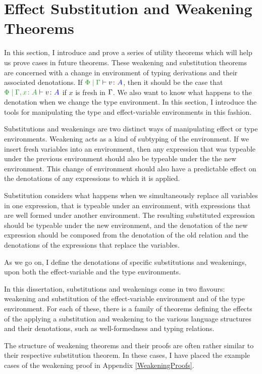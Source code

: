 \documentclass{Report}
\begin{document}
\section{Effect Substitution and Weakening Theorems}\label{SubsAndWeakening}


In this section, I introduce and prove a series of utility theorems which will help us prove cases in future theorems. These weakening and substitution theorems are concerned with a change in environment of typing derivations and their associated denotations. If $\gpetyperelation{v}{A}$, then it should be the case that $\etyperelation{\P}{\gax}{v}{A}$ if $x$ is fresh in $\Gamma$. We also want to know what happens to the denotation when we change the type environment. In this section, I introduce the tools for manipulating the type and effect-variable environments in this fashion.

Substitutions and weakenings are two distinct ways of manipulating effect or type environments. Weakening acts as a kind of subtyping of the environment. If we insert fresh variables into an environment, then any expression that was typeable under the previous environment should also be typeable under the the new environment. This change of environment should also have a predictable effect on the denotations of any expressions to which it is applied.

Substitution considers what happens when we simultaneously replace all variables in one expression, that is typeable under an environment, with expressions that are well formed under another environment. The resulting substituted expression should be typeable under the new environment, and the denotation of the new expression should be composed from the denotation of the old relation and the denotations of the expressions that replace the variables. 

As we go on, I define the denotations of specific substitutions and weakenings, upon both the effect-variable and the type environments.

In this dissertation, substitutions and weakenings come in two flavours: weakening and substitution of the effect-variable environment and of the type environment. For each of these, there is a family of theorems defining the effects of the applying a substitution and weakening to the various language structures and their denotations, such as well-formedness and typing relations.

\begin{framed}
    \begin{aside}
        The structure of weakening theorems and their proofs are often rather similar to their respective substitution theorem. In these cases, I have placed the example cases of the weakening proof in Appendix \ref{WeakeningProofs}.
    \end{aside}
\end{framed}
\end{document}
